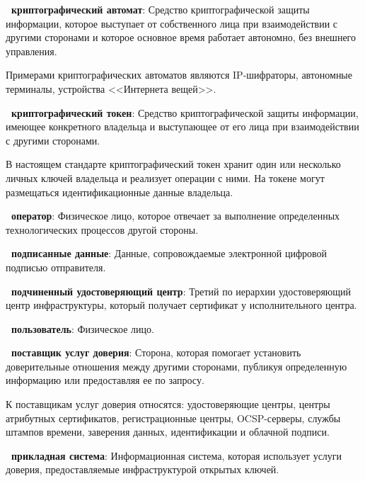 {\bf\thedefctr~криптографический автомат}: 
Средство криптографической защиты информации, которое выступает от 
собственного лица при взаимодействии с другими сторонами
и которое основное время работает автономно, без внешнего управления.

\begin{note*}
Примерами криптографических автоматов являются IP-шифраторы, 
автономные терминалы, устройства <<Интернета вещей>>.
\end{note*}

{\bf\thedefctr~криптографический токен}: 
Средство криптографической защиты информации, имеющее конкретного 
владельца и выступающее от его лица при взаимодействии с другими 
сторонами. 
%
\begin{note*}
В настоящем стандарте криптографический токен хранит один 
или несколько личных ключей владельца и реализует операции с ними.  
%
На токене могут размещаться идентификационные данные владельца. 
\end{note*}

{\bf \thedefctr~оператор}:
Физическое лицо, которое отвечает за выполнение определенных 
технологических процессов другой стороны.

{\bf \thedefctr~подписанные данные}:
Данные, сопровождаемые электронной цифровой подписью отправителя. 

{\bf\thedefctr~подчиненный удостоверяющий центр}:
Третий по иерархии удостоверяющий центр инфраструктуры, который получает 
сертификат у исполнительного центра.

{\bf\thedefctr~пользователь}: 
Физическое лицо.

{\bf\thedefctr~поставщик услуг доверия}:
Сторона, которая помогает установить доверительные отношения между другими 
сторонами, публикуя определенную информацию или предоставляя ее по запросу.


\begin{note*}
К поставщикам услуг доверия относятся: удостоверяющие центры, центры атрибутных
сертификатов, регистрационные центры, OCSP-серверы, службы штампов времени,
заверения данных, идентификации и облачной подписи.
\end{note*}

{\bf\thedefctr~прикладная система}:
Информационная система, которая использует услуги доверия, предоставляемые
инфраструктурой открытых ключей.
%


